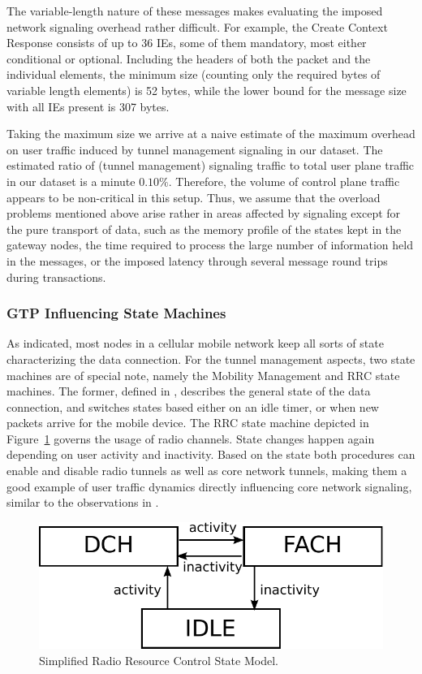 The variable-length nature of these messages makes evaluating the imposed network signaling overhead rather difficult. For example, the Create Context Response consists of up to 36 \acp{IE}, some of them mandatory, most either conditional or optional. Including the headers of both the packet and the individual elements, the minimum size (counting only the required bytes of variable length elements) is 52 bytes, while the lower bound for the message size with all \acp{IE} present is 307 bytes.

Taking the maximum size we arrive at a naive estimate of the maximum overhead on user traffic induced by tunnel management signaling in our dataset. The estimated ratio of (tunnel management) signaling traffic to total user plane traffic in our dataset is a minute $0.10\%$. Therefore, the volume of control plane traffic appears to be non-critical in this setup. Thus, we assume that the overload problems mentioned above arise rather in areas affected by signaling except for the pure transport of data, such as the memory profile of the states kept in the gateway nodes, the time required to process the large number of information held in the messages, or the imposed latency through several message round trips during transactions.


\subsubsection{GTP Influencing State Machines}

As indicated, most nodes in a cellular mobile network keep all sorts of state characterizing the data connection. For the tunnel management aspects, two state machines are of special note, namely the Mobility Management and RRC state machines.
The former, defined in \cite{3gpp23.060}, describes the general state of the data connection, and switches states based either on an idle timer, or when new packets arrive for the mobile device. The \ac{RRC} state machine depicted in Figure~\ref{c4:fig:rrcstatemodel} governs the usage of radio channels. State changes happen again depending on user activity and inactivity.
Based on the state both procedures can enable and disable radio tunnels as well as core network tunnels, making them a good example of user traffic dynamics directly influencing core network signaling, similar to the observations in \cite{lee2007detection}.

\begin{figure}[htbp]
	\centering
	\includegraphics[width=0.8\columnwidth]{images/IMC2013/rrc-simplified-state-model.pdf}
	\caption{Simplified Radio Resource Control State Model.}
	\label{c4:fig:rrcstatemodel}
\end{figure}


